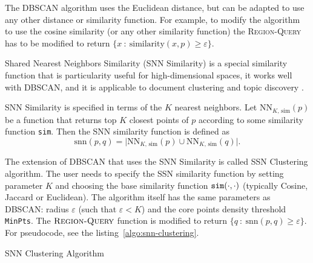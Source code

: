 The DBSCAN algorithm uses the Euclidean distance, but can be adapted to
use any other distance or similarity function. For example, to modify the
algorithm to use the cosine similarity (or any other similarity function)
the \textsc{Region-Query} has to be modified to return
$\{ x \ : \ \text{similarity}(x, p) \geqslant \varepsilon \}$.

Shared Nearest Neighbors Similarity (SNN Similarity) \cite{ertoz2003finding}
is a special similarity function that is particularity useful for
high-dimensional spaces, it works well with DBSCAN, and it is
applicable to document clustering and topic discovery \cite{ertoz2004finding}.

SNN Similarity is specified in terms of the $K$ nearest neighbors.
Let $\text{NN}_{K, \, \text{sim}}(p)$ be a function that returns
top $K$ closest points of $p$ according to some similarity function
\texttt{sim}. Then the SNN similarity function is  defined as
$$\text{snn}(p, q) = \big| \text{NN}_{K, \, \text{sim}}(p) \cup \text{NN}_{K, \, \text{sim}}(q) \big|.$$


The extension of DBSCAN that uses the SNN Similarity is called
SSN Clustering algorithm. The user needs to specify the SSN similarity
function by setting parameter $K$ and choosing the base similarity
function $\text{\texttt{sim}}(\cdot, \cdot)$ (typically Cosine, Jaccard
or Euclidean). The algorithm itself has the same
parameters as DBSCAN: radius $\varepsilon$ (such that $\varepsilon < K$)
and the core points density threshold \verb|MinPts|. The
$\textsc{Region-Query}$ function is modified to return
$\{ q \ : \ \text{snn}(p, q) \geqslant \varepsilon \}$. For pseudocode,
see the listing~\ref{algo:snn-clustering}.

\begin{algorithm} \caption{SNN Clustering Algorithm} \label{algo:snn-clustering}

\begin{algorithmic}[0]
  \Statex
     
    \EndFor

     
    \EndFor

    \State {}
  \EndFunction
\end{algorithmic}

\end{algorithm}


